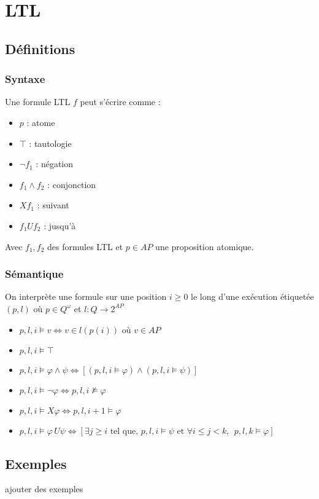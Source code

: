 \documentclass{beamer}
\theoremstyle{plain}
\theoremstyle{definition}
\begin{document}
\section{LTL}
\subsection{Définitions}
\begin{frame}
  \frametitle{Syntaxe}
  Une formule LTL $f$ peut s'écrire comme :
  \begin{itemize}
  \item $p$ : atome
  \item $\top$ : tautologie
  \item $\lnot f_1$ : négation
  \item $f_1 \land f_2$ : conjonction
  \item $X f_1$ : suivant
  \item $f_1 U f_2$ : jusqu'à
  \end{itemize}
  Avec $f_1, f_2$ des formules LTL et $p \in AP$ une proposition atomique.
\end{frame}


\begin{frame}
  \frametitle{Sémantique}

  On interprète une formule sur une position $i \geq 0$ le long d'une exécution étiquetée $(p, l)$ où $p \in Q^\omega$ et $l : Q \to 2^{AP}$ 
  
  \begin{itemize}
  \item $p,l,i \models v \Leftrightarrow v \in l(p(i))$ où $v \in AP$
  \item $p,l,i \models \top$
  \item $p,l,i \models \varphi \land \psi \Leftrightarrow [(p,l,i \models \varphi) \land (p,l,i \models \psi)]$
  \item $p,l,i \models \lnot \varphi \Leftrightarrow p,l,i \not \models \varphi$
  \item $p,l,i \models X\varphi \Leftrightarrow p,l,i+1 \models \varphi$
  \item $p,l,i \models \varphi\, U \psi \Leftrightarrow [\exists j \geq i\textrm{ tel que, } p,l,i \models \psi \textrm{ et } \forall i \leq j < k, \:\: p,l,k\models \varphi]$
  \end{itemize}
\end{frame}

  
\subsection{Exemples}
\begin{frame}
  ajouter des exemples
\end{frame}
\end{document}
